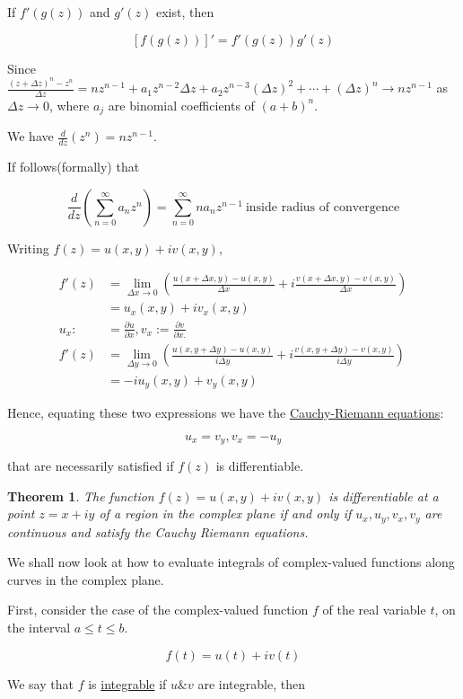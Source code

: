\documentclass[twoside]{article}
\newcounter{lecnum}
\newtheorem{theorem}{Theorem}[lecnum]
\begin{document}
If $f'(g(z))$ and $g'(z)$ exist, then

$$[f(g(z))]'=f'(g(z))g'(z)$$

Since $\frac{(z+\Delta z)^n-z^n}{\Delta z}=nz^{n-1}+a_1z^{n-2}\Delta z + a_2z^{n-3}(\Delta z)^2+\cdots +(\Delta z)^n\to nz^{n-1}$ as $\Delta z\to 0$, where $a_j$ are binomial coefficients of $(a+b)^n$.

We have $\frac{d}{dz}(z^n)=nz^{n-1}.$

If follows(formally) that

$$\frac{d}{dz}\left(\sum^\infty_{n=0}a_nz^n\right)=\sum^\infty_{n=0}na_nz^{n-1}\ \text{inside radius of convergence}$$

Writing $f(z)=u(x,y)+iv(x,y),$

\begin{equation}
	\begin{split}
		f'(z)&=\lim_{\Delta x\to 0}\left(\frac{u(x+\Delta x, y)-u(x,y)}{\Delta x}+i\frac{v(x+\Delta x, y)-v(x,y)}{\Delta x}\right)\\
		&=u_x(x,y)+iv_x(x,y)\\
		u_x:&=\frac{\partial u}{\partial x}, v_x:=\frac{\partial v}{\partial x.}\\
		f'(z)&=\lim_{\Delta y\to 0}\left(\frac{u(x,y+\Delta y)-u(x,y)}{i\Delta y}+i\frac{v(x,y+\Delta y)-v(x,y)}{i\Delta y}\right)\\
		&=-iu_y(x,y)+v_y(x,y)
	\end{split}
\end{equation}

Hence, equating these two expressions we have the \underline{Cauchy-Riemann equations}:

$$u_x=v_y, v_x=-u_y$$

that are necessarily satisfied if $f(z)$ is differentiable.

\begin{theorem}
	The function $f(z)=u(x,y)+iv(x,y)$ is differentiable at a point $z=x+iy$ of a region in the complex plane if and only if $u_x, u_y, v_x, v_y$ are continuous and satisfy the Cauchy Riemann equations.
\end{theorem}

We shall now look at how to evaluate integrals of complex-valued functions along curves in the complex plane.

First, consider the case of the complex-valued function $f$ of the real variable $t$, on the interval $a\leq t\leq b$.

$$f(t)=u(t)+iv(t)$$

We say that $f$ is \underline{integrable} if $u\& v$ are integrable, then 
\end{document}
